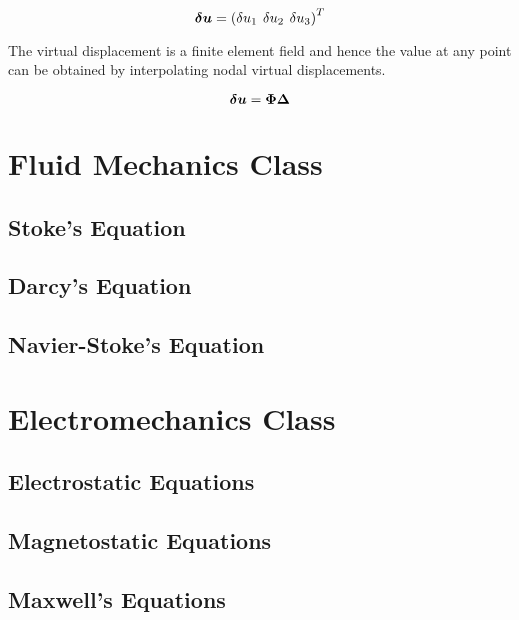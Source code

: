 \begin{equation}
  \vect{\delta u}=\transpose{\pbrac{\delta u_{1} \hspace{4 pt} \delta u_{2} \hspace{4 pt} \delta u_{3}}}
  \label{eqn:displacementvector}
\end{equation}

The virtual displacement is a finite element field and hence the value at any point can be obtained by interpolating nodal 
virtual displacements.

\begin{equation}
  \vect{\delta u}=\matr{\Phi}\matr{\Delta}
  \label{eqn:interpolation}
\end{equation}



\section{Fluid Mechanics Class}

\subsection{Stoke's Equation}

\subsection{Darcy's Equation}

\subsection{Navier-Stoke's Equation}

\section{Electromechanics Class}

\subsection{Electrostatic Equations}

\subsection{Magnetostatic Equations}

\subsection{Maxwell's Equations}

